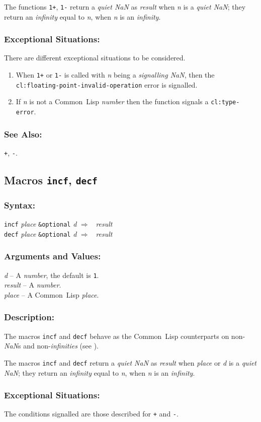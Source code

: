\documentclass[10pt,fleqn]{article}
\newcommand{\CL}{\textsf{Common~Lisp}}
\newcommand{\code}[1]{\texttt{#1}}
\newcommand{\clieeeterm}[1]{\textit{#1}}
\newcommand{\varname}[1]{\textit{#1}}
\newcommand{\clterm}[1]{\textit{#1}}
\newcommand{\clname}[1]{\texttt{#1}}
\newcommand{\RArrow}{$\Rightarrow$}
\newcommand{\DDictionaryItem}[1]{\vspace*{6pt}\noindent\hrulefill\vspace*{-9pt}\subsection*{#1}}
\newcommand{\DSyntax}{\subsubsection*{Syntax:}}
\newcommand{\DArgsNValues}{\subsubsection*{Arguments and Values:}}
\newcommand{\DDescription}{\subsubsection*{Description:}}
\newcommand{\DExceptional}{\subsubsection*{Exceptional Situations:}}
\newcommand{\DSeeAlso}{\subsubsection*{See Also:}}
\begin{document}
The functions \code{1+}, \code{1-} return a \clieeeterm{quiet NaN} as \varname{result}
when \varname{n} is a \clieeeterm{quiet NaN}; they return an
\clieeeterm{infinity} equal to \varname{n}, when \varname{n} is an
\clieeeterm{infinity}.

\DExceptional{}

There are different exceptional situations to be considered.

\begin{enumerate}
\item When \code{1+} or \code{1-} is called with \varname{n}
  being a \emph{signalling NaN}, then the\\
  \clname{cl:floating-point-invalid-operation} error is signalled.

\item If \varname{n} is not a \CL{} \clterm{number} then the function
  signals a \clname{cl:type-error}.
\end{enumerate}

\DSeeAlso{}

\code{+}, \code{-}.


\DDictionaryItem{Macros \code{incf}, \code{decf}}

\DSyntax{}

\code{incf} \varname{place} \code{\&optional} \varname{d} \RArrow ~ \varname{result}\\
\code{decf} \varname{place} \code{\&optional} \varname{d} \RArrow ~ \varname{result}

\DArgsNValues{}

\varname{d} -- A \clterm{number}, the default is \code{1}.\\
\varname{result} -- A \clterm{number}.\\
\varname{place} -- A \CL{} \clterm{place}.\\


\DDescription{}

The macros \code{incf} and \code{decf} behave
as the \CL{} counterparts on non-\clieeeterm{NaN}s and
non-\clieeeterm{infinities} (see \cite{1996:ANSIHyperSpec}).

The macros \code{incf} and \code{decf} return a \clieeeterm{quiet NaN}
as \varname{result} when \varname{place} or \varname{d} is a
\clieeeterm{quiet NaN}; they return an \clieeeterm{infinity} equal to
\varname{n}, when \varname{n} is an \clieeeterm{infinity}.

\DExceptional{}

The conditions signalled are those described for \code{+} and \code{-}.
\end{document}
